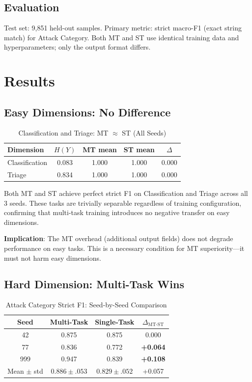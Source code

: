 \documentclass[review,3p]{elsarticle}
\begin{document}
\subsection{Evaluation}
Test set: 9,851 held-out samples. Primary metric: strict macro-F1 (exact string match) for Attack Category. Both MT and ST use identical training data and hyperparameters; only the output format differs.

\section{Results}

\subsection{Easy Dimensions: No Difference}

\begin{table}[!ht]
\centering
\caption{Classification and Triage: MT $\approx$ ST (All Seeds)}
\label{tab:easy}
\begin{tabular}{lcccc}
\toprule
\textbf{Dimension} & $H(Y)$ & \textbf{MT mean} & \textbf{ST mean} & $\Delta$ \\
\midrule
Classification & 0.083 & 1.000 & 1.000 & 0.000 \\
Triage  & 0.834 & 1.000 & 1.000 & 0.000 \\
\bottomrule
\end{tabular}
\end{table}

Both MT and ST achieve perfect strict F1 on Classification and Triage across all 3 seeds. These tasks are trivially separable regardless of training configuration, confirming that multi-task training introduces no negative transfer on easy dimensions.

\textbf{Implication}: The MT overhead (additional output fields) does not degrade performance on easy tasks. This is a necessary condition for MT superiority---it must not harm easy dimensions.

\subsection{Hard Dimension: Multi-Task Wins}

\begin{table}[!ht]
\centering
\caption{Attack Category Strict F1: Seed-by-Seed Comparison}
\label{tab:atk}
\begin{tabular}{cccc}
\toprule
\textbf{Seed} & \textbf{Multi-Task} & \textbf{Single-Task} & $\Delta_\text{MT-ST}$ \\
\midrule
42 & 0.875 & 0.875 & 0.000 \\
77 & 0.836 & 0.772 & \textbf{+0.064} \\
999 & 0.947 & 0.839 & \textbf{+0.108} \\
\midrule
Mean $\pm$ std & $\mathbf{0.886 \pm .053}$ & $0.829 \pm .052$ & +0.057 \\
\bottomrule
\end{tabular}
\end{table}
\end{document}
